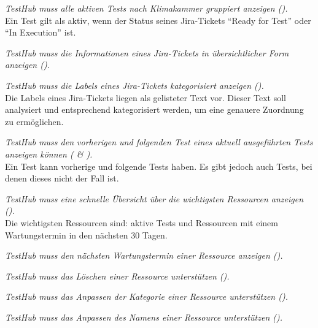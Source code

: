 \begin{description}


    \textit{TestHub muss alle aktiven Tests nach Klimakammer gruppiert anzeigen ().}\\
    Ein Test gilt als aktiv, wenn der Status seines Jira-Tickets ``Ready for Test''
    oder ``In Execution'' ist.

    \textit{TestHub muss die Informationen eines Jira-Tickets in übersichtlicher 
    Form anzeigen ().}

    \textit{TestHub muss die Labels eines Jira-Tickets kategorisiert anzeigen ().}\\
    Die Labels eines Jira-Tickets liegen als gelisteter Text vor. Dieser 
    Text soll analysiert und entsprechend kategorisiert werden, um eine genauere 
    Zuordnung zu ermöglichen.

    \textit{TestHub muss den vorherigen und folgenden Test eines aktuell 
    ausgeführten Tests anzeigen können ( \& ).}\\
    Ein Test kann vorherige und folgende Tests haben. Es gibt jedoch auch Tests,
    bei denen dieses nicht der Fall ist.    

    \textit{TestHub muss eine schnelle Übersicht über die wichtigsten Ressourcen anzeigen ().}\\
    Die wichtigsten Ressourcen sind: aktive Tests und Ressourcen mit einem Wartungstermin
    in den nächsten 30 Tagen.

    \textit{TestHub muss den nächsten Wartungstermin einer Ressource anzeigen ().}
    
    \textit{TestHub muss das Löschen einer Ressource unterstützen ().}
       
    \textit{TestHub muss das Anpassen der Kategorie einer Ressource unterstützen 
    ().}

    \textit{TestHub muss das Anpassen des Namens einer Ressource unterstützen 
    ().}


\end{description}
